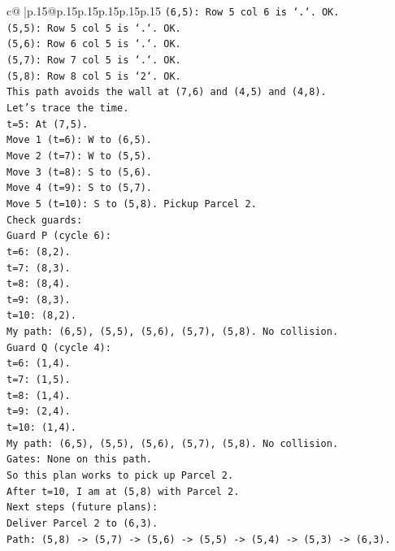 \documentclass{article}
\begin{document}
{\begin{supertabular}{c@{$\;$}|p{.15\linewidth}@{}p{.15\linewidth}p{.15\linewidth}p{.15\linewidth}p{.15\linewidth}p{.15\linewidth}}
{{{\texttt{(6,5): Row 5 col 6 is `.`. OK.} \\
\texttt{(5,5): Row 5 col 5 is `.`. OK.} \\
\texttt{(5,6): Row 6 col 5 is `.`. OK.} \\
\texttt{(5,7): Row 7 col 5 is `.`. OK.} \\
\texttt{(5,8): Row 8 col 5 is `2`. OK.} \\
\texttt{This path avoids the wall at (7,6) and (4,5) and (4,8).} \\
\texttt{Let's trace the time.} \\
\texttt{t=5: At (7,5).} \\
\texttt{Move 1 (t=6): W to (6,5).} \\
\texttt{Move 2 (t=7): W to (5,5).} \\
\texttt{Move 3 (t=8): S to (5,6).} \\
\texttt{Move 4 (t=9): S to (5,7).} \\
\texttt{Move 5 (t=10): S to (5,8). Pickup Parcel 2.} \\
\texttt{Check guards:} \\
\texttt{Guard P (cycle 6):} \\
\texttt{t=6: (8,2).} \\
\texttt{t=7: (8,3).} \\
\texttt{t=8: (8,4).} \\
\texttt{t=9: (8,3).} \\
\texttt{t=10: (8,2).} \\
\texttt{My path: (6,5), (5,5), (5,6), (5,7), (5,8). No collision.} \\
\texttt{Guard Q (cycle 4):} \\
\texttt{t=6: (1,4).} \\
\texttt{t=7: (1,5).} \\
\texttt{t=8: (1,4).} \\
\texttt{t=9: (2,4).} \\
\texttt{t=10: (1,4).} \\
\texttt{My path: (6,5), (5,5), (5,6), (5,7), (5,8). No collision.} \\
\texttt{Gates: None on this path.} \\
\texttt{So this plan works to pick up Parcel 2.} \\
\texttt{After t=10, I am at (5,8) with Parcel 2.} \\
\texttt{Next steps (future plans):} \\
\texttt{Deliver Parcel 2 to (6,3).} \\
\texttt{Path: (5,8) {-}> (5,7) {-}> (5,6) {-}> (5,5) {-}> (5,4) {-}> (5,3) {-}> (6,3).} \\
}}}
\end{supertabular}}
\end{document}
